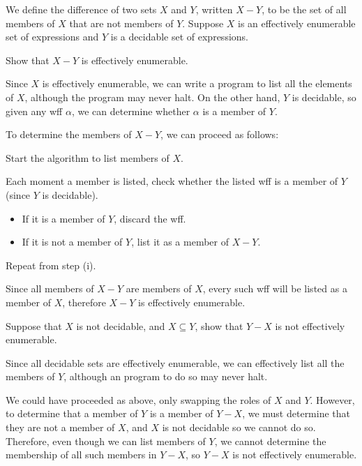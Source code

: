 \begin{problem}
  We define the difference of two sets $X$ and $Y$,
  written $X - Y$, to be the set of all members of $X$
  that are not members of $Y$.
  Suppose $X$ is an effectively enumerable set of expressions
  and $Y$ is a decidable set of expressions.
  \begin{enumalph}
    \item Show that $X - Y$ is effectively enumerable.
      \begin{Answer}
        Since $X$ is effectively enumerable, we can write a program to list
        all the elements of $X$, although the program may never halt.
        On the other hand, $Y$ is decidable, so given any wff $\alpha$,
        we can determine whether $\alpha$ is a member of $Y$.

        \step
        To determine the members of $X - Y$, we can proceed as follows:
        \begin{enumroman}
          \item Start the algorithm to list members of $X$.
          \item Each moment a member is listed, check whether the listed wff
             is a member of $Y$ (since $Y$ is decidable).
            \begin{itemize}
              \item If it is a member of $Y$, discard the wff.
              \item If it is not a member of $Y$, list it as a member of $X - Y$.
            \end{itemize}
          \item Repeat from step (i).
        \end{enumroman}
        Since all members of $X - Y$ are members of $X$,
        every such wff will be listed as a member of $X$,
        therefore $X - Y$ is effectively enumerable.
      \end{Answer}
    \newpage
    \item Suppose that $X$ is not decidable, and $X \subseteq Y$,
      show that $Y - X$ is not effectively enumerable.
      \begin{Answer}
        Since all decidable sets are effectively enumerable,
        we can effectively list all the members of $Y$,
        although an program to do so may never halt.

        \step
        We could have proceeded as above,
        only swapping the roles of $X$ and $Y$.
        However, to determine that a member of $Y$ is a member of $Y - X$,
        we must determine that they are not a member of $X$,
        and $X$ is not decidable so we cannot do so.
        Therefore, even though we can list members of $Y$,
        we cannot determine the membership of all such members in $Y - X$,
        so $Y - X$ is not effectively enumerable.


\end{Answer}
\end{enumalph}
\end{problem}

